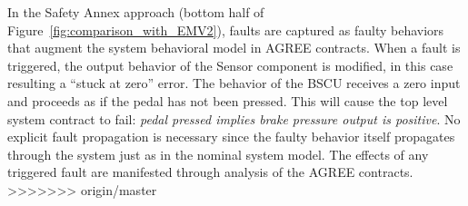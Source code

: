 In the Safety Annex approach (bottom half of Figure~\ref{fig:comparison_with_EMV2}), faults are captured as faulty behaviors that augment the system behavioral model in AGREE contracts.  When a fault is triggered, the output behavior of the Sensor component is modified, in this case resulting a ``stuck at zero'' error. The behavior of the BSCU receives a zero input and proceeds as if the pedal has not been pressed. This will cause the top level system contract to fail: {\em pedal pressed implies brake pressure output is positive}. No explicit fault propagation is necessary since the faulty behavior itself propagates through the system just as in the nominal system model. The effects of any triggered fault are manifested through analysis of the AGREE contracts. 
>>>>>>> origin/master
 



